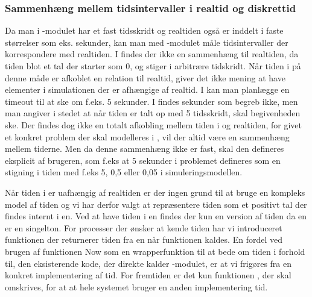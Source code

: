  
\subsubsection{Sammenhæng mellem tidsintervaller i realtid og diskrettid}
Da man i -modulet har et fast tidsskridt og
realtiden også er inddelt i faste størrelser
som eks. sekunder, kan man med -modulet måle tidsintervaller der
korrespondere med realtiden. I \des findes der ikke en
sammenhæng til  realtiden, da tiden blot et tal der starter som 0, og stiger
i arbitrære tidskridt. Når tiden i \des på denne måde er afkoblet
en relation til realtid, giver det ikke mening at have elementer i simulationen der er afhængige af realtid. 
I \pycsp kan man planlægge en timeout til at ske om f.eks. 5 sekunder. I \des findes sekunder som
begreb ikke, men man  angiver i stedet at når tiden er talt op med 5 tidsskridt, skal
begivenheden ske. Der findes dog ikke en totalt afkobling mellem tiden i \des og realtiden, for givet et konkret problem der skal modelleres i \des, vil der altid være en sammenhæng mellem tiderne. Men da denne sammenhæng ikke er fast, skal den defineres eksplicit af brugeren, som f.eks at 5 sekunder i problemet defineres som en stigning i tiden med f.eks 5, 0,5 eller 0,05 i simuleringsmodellen.

Når tiden i \des er uafhængig af realtiden er der ingen grund til at bruge en kompleks model af tiden og vi har derfor valgt at repræsentere tiden som et positivt tal der findes internt i \sched en. Ved at have tiden i \sched en findes der kun en version af tiden da  \sched en er en singelton. For processer der ønsker at kende tiden har vi
introduceret funktionen  der returnerer tiden fra \sched en når funktionen kaldes. En fordel ved brugen af funktionen Now som en wrapperfunktion til at bede om tiden i forhold til, den eksisterende kode, der direkte kalder -modulet, er at vi frigøres fra en konkret implementering af tid. For fremtiden er det kun funktionen , der skal omskrives, for at at hele systemet bruger en anden implementering tid.

